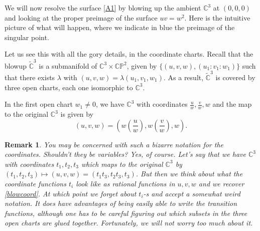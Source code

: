\documentclass[11pt]{article}
\numberwithin{equation}{section}
\numberwithin{footnote}{section}
\newtheorem{rem}[thm]{Remark}
\renewcommand{\P}{{\mathbb P}}
\newcommand{\C}{{\mathbb C}}
\begin{document}
\smallskip
We will now resolve the surface \eqref{A1} by blowing up the ambient $\C^3$ at $(0,0,0)$ and looking at the proper preimage of the surface $uv=w^2$. Here is the intuitive picture of what will happen, where we indicate in blue the preimage of the singular point.



Let us see this with all the gory details, in the coordinate charts. Recall that the blowup $\tilde \C^3$ is a submanifold of $\C^3 \times \C\P^2$, given by $\{(u,v,w),(u_1:v_1:w_1)\}$ such that there exists $\lambda$ with $(u,v,w) = \lambda (u_1,v_1,w_1)$.
As a result, $\tilde \C^3$ is covered by three open charts, each one isomorphic to $\C^3$.

\smallskip
In the first open chart $w_1\neq 0$, we have $\C^3$ with coordinates $\frac {u}{w}, \frac {v}{w},w$ and the 
map to the original $\C^3$ is given by
\begin{equation}\label{blowcoord}
(u,v,w) = (w \left(\frac {u}{w}\right), w \left(\frac {v}{w}\right), w).
\end{equation}

\smallskip
\begin{rem}
You may be concerned with such a bizarre notation for the coordinates. Shouldn't they be variables? Yes, of course. Let's say that we have $\C^3$ with coordinates $t_1,t_2,t_3$ which maps to the original $\C^3$ by $(t_1,t_2,t_3)\mapsto (u,v,w)=(t_1 t_3,t_2 t_3, t_3)$.
But then we think about what the coordinate functions $t_i$ look like as rational functions in $u,v,w$ and we recover \eqref{blowcoord}. At which point we forget about $t_i$-s and accept a somewhat weird notation. It does have advantages of being easily able to write the transition functions, although one has to be careful figuring out which subsets in the three open charts are glued together. Fortunately, we will not worry too much about it.
\end{rem}
\end{document}
